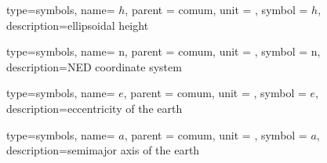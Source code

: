 {type=symbols,
  name= \ensuremath{h},
  parent = {comum},
  unit = \unexpanded{\si{\meter}},
  symbol = \ensuremath{h},
  description={ellipsoidal height}
}

{type=symbols,
  name= \ensuremath{\mathrm{n}},
  parent = {comum},
  unit = \unexpanded{},
  symbol = \ensuremath{\mathrm{n}},
  description={NED coordinate system}
}

{type=symbols,
  name= \ensuremath{e},
  parent = {comum},
  unit = \unexpanded{},
  symbol = \ensuremath{e},
  description={eccentricity of the earth}
}

{type=symbols,
  name= \ensuremath{a},
  parent = {comum},
  unit = \unexpanded{\si{\meter}},
  symbol = \ensuremath{a},
  description={semimajor axis of the earth}
}

